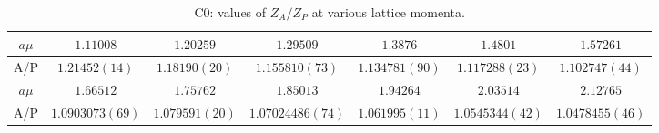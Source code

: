 \begin{table}[h!]
\begin{center}
\caption{C0: values of $Z_A/Z_P$ at various lattice momenta.}
\begin{tabular}{c|c c c c c c}
\hline
\hline
$a\mu$ & $1.11008$ & $1.20259$ & $1.29509$ & $1.3876$ & $1.4801$ & $1.57261$ \\
\hline
A/P & $1.21452(14)$ & $1.18190(20)$ & $1.155810(73)$ & $1.134781(90)$ & $1.117288(23)$ & $1.102747(44)$ \\
\hline
$a\mu$ & $1.66512$ & $1.75762$ & $1.85013$ & $1.94264$ & $2.03514$ & $2.12765$ \\
\hline
A/P & $1.0903073(69)$ & $1.079591(20)$ & $1.07024486(74)$ & $1.061995(11)$ & $1.0545344(42)$ & $1.0478455(46)$ \\
\hline
\hline
\end{tabular}
\end{center}
\end{table}